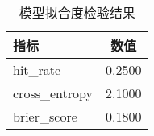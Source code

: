 \begin{table}[htbp]
\centering
\caption{模型拟合度检验结果}
\begin{tabular}{lc}
\toprule
指标 & 数值 \\
\midrule
hit_rate & 0.2500 \\
cross_entropy & 2.1000 \\
brier_score & 0.1800 \\
\bottomrule
\end{tabular}
\end{table}
